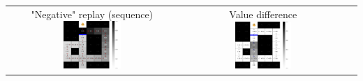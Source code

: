 \documentclass{article}
\begin{document}
\begin{center}
\begin{tabular}{ccc}
        \shortstack{"Negative" replay (sequence) \\ \includegraphics[width=0.35\textwidth]{Figures/replay_negative.pdf}} & \shortstack{Value difference \\ \includegraphics[width=0.35\textwidth]{Figures/replay_negative_diff.pdf}}
    \end{tabular}
\end{center}
\end{document}
